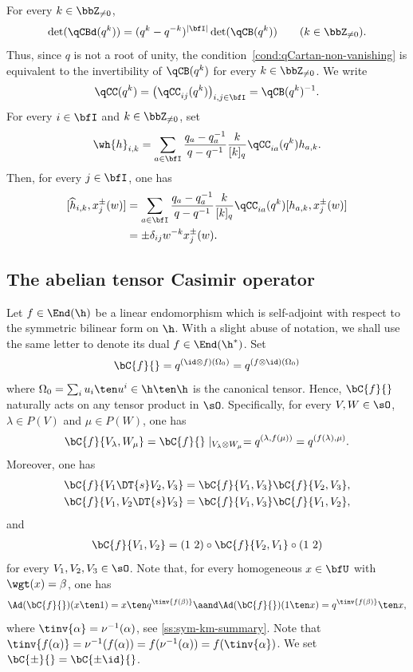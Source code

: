 \documentclass[reqno]{amsart}
\numberwithin{equation}{section}
\begin{document}
For every $k\in\bbZ_{\neq0}$, 
\[
\det(\qCBd(q^k))
=
(q^k-q^{-k})^{|\bfI|}\det(\qCB(q^k))
\qquad(k\in\bbZ_{\neq0}).
\] 
Thus, since $q$ is not a root of unity, the condition~\ref{cond:qCartan-non-vanishing} is equivalent to the
invertibility of $\qCB(q^k)$ for every $k\in\bbZ_{\neq0}$. We write
\[
\qCC(q^k)
=
\bigl(\qCC_{ij}(q^k)\bigr)_{i,j\in\bfI}
=
\qCB(q^k)^{-1}.
\]
For every $i\in\bfI$ and $k\in\bbZ_{\neq0}$, set
\[
\wh{h}_{i,k}
=
\sum_{a\in\bfI}
\frac{q_a-q_a^{-1}}{q-q^{-1}}
\frac{k}{[k]_q}
\qCC_{ia}(q^k)h_{a,k}.
\]
Then, for every $j\in\bfI$, one has
\[
\begin{aligned}
[\widehat h_{i,k},x_j^\pm(w)]
&=
\sum_{a\in\bfI}
\frac{q_a-q_a^{-1}}{q-q^{-1}}
\frac{k}{[k]_q}
\qCC_{ia}(q^k)[h_{a,k},x_j^\pm(w)]\\
&=
\pm\delta_{ij}w^{-k}x_j^\pm(w).
\end{aligned}
\]

\subsection{The abelian tensor Casimir operator}\label{ss:operator-C}
Let $f\in\End(\h)$ be a linear endomorphism which is self-adjoint with respect to the symmetric bilinear form on $\h$. With a slight abuse of notation, we shall use the same letter to denote its dual $f\in\End(\h^*)$. Set
\begin{equation}\label{eq:operator-C}
\bC{f}{}=q^{(\id\otimes f)(\Omega_0)}=q^{(f\otimes\id)(\Omega_0)}	
\end{equation}
where $\Omega_0=\sum_iu_i\ten u^i\in\h\ten\h$ is the canonical tensor. Hence, $\bC{f}{}$ naturally acts on any tensor product in $\sO$. Specifically, for every $V,W\in\sO$, $\lambda\in P(V)$ and $\mu\in P(W)$, one has
\begin{align}\label{eq:operator-C-weight}
\bC{f}{V_\lambda, W_\mu}=\bC{f}{}\mid_{V_\lambda\otimes W_\mu}=q^{(\lambda,f(\mu))}=q^{(f(\lambda),\mu)}.
\end{align}
Moreover, one has
\begin{equation}
\label{eq:coproduct-operator-C}
\begin{aligned}
	\bC{f}{V_1\DT{s}V_2,V_3}&=\bC{f}{V_1,V_3}\bC{f}{V_2,V_3},\\
	\bC{f}{V_1,V_2\DT{s}V_3}&=\bC{f}{V_1,V_3}\bC{f}{V_1,V_2},
\end{aligned}
\end{equation}
and
\begin{align}\label{eq:twisted-operator-C}
\bC{f}{V_1,V_2}=(1\ 2)\circ\bC{f}{V_2,V_1}\circ(1\ 2)	
\end{align}
for every $V_1,V_2,V_3\in\sO$.
Note that, for every homogeneous $x\in\bfU$ with $\wgt(x)=\beta$, 
one has 
\begin{equation}
\label{eq:adjoint-C}
\Ad(\bC{f}{})(x\ten 1)=x\ten q^{\tinv{f(\beta)}}
\aand
\Ad(\bC{f}{})(1\ten x)=q^{\tinv{f(\beta)}}\ten x,
\end{equation}
where $\tinv{\alpha}=\nu^{-1}(\alpha)$, see \ref{ss:sym-km-summary}.
Note that $\tinv{f(\alpha)}=\nu^{-1}(f(\alpha))=f(\nu^{-1}(\alpha))=f(\tinv{\alpha})$.
We set $\bC{\pm}{}=\bC{\pm\id}{}$.
\end{document}
